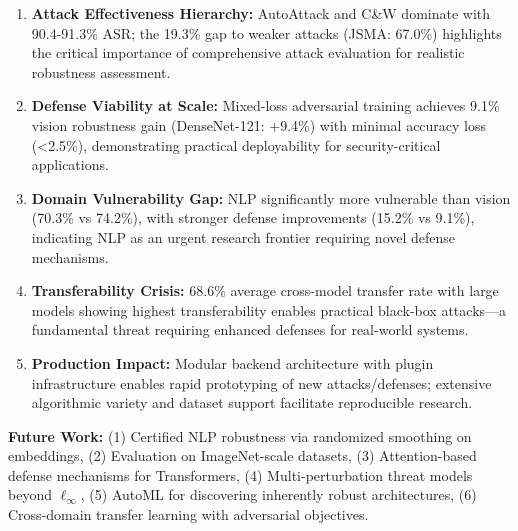 \documentclass[10pt,conference]{IEEEtran}
\begin{document}
\begin{enumerate}
\item \textbf{Attack Effectiveness Hierarchy:} AutoAttack and C\&W dominate with 90.4-91.3\% ASR; the 19.3\% gap to weaker attacks (JSMA: 67.0\%) highlights the critical importance of comprehensive attack evaluation for realistic robustness assessment.

\item \textbf{Defense Viability at Scale:} Mixed-loss adversarial training achieves 9.1\% vision robustness gain (DenseNet-121: +9.4\%) with minimal accuracy loss (<2.5\%), demonstrating practical deployability for security-critical applications.

\item \textbf{Domain Vulnerability Gap:} NLP significantly more vulnerable than vision (70.3\% vs 74.2\%), with stronger defense improvements (15.2\% vs 9.1\%), indicating NLP as an urgent research frontier requiring novel defense mechanisms.

\item \textbf{Transferability Crisis:} 68.6\% average cross-model transfer rate with large models showing highest transferability enables practical black-box attacks---a fundamental threat requiring enhanced defenses for real-world systems.

\item \textbf{Production Impact:} Modular backend architecture with plugin infrastructure enables rapid prototyping of new attacks/defenses; extensive algorithmic variety and dataset support facilitate reproducible research.
\end{enumerate}

\textbf{Future Work:} (1) Certified NLP robustness via randomized smoothing on embeddings, (2) Evaluation on ImageNet-scale datasets, (3) Attention-based defense mechanisms for Transformers, (4) Multi-perturbation threat models beyond $\ell_\infty$, (5) AutoML for discovering inherently robust architectures, (6) Cross-domain transfer learning with adversarial objectives.
\end{document}
